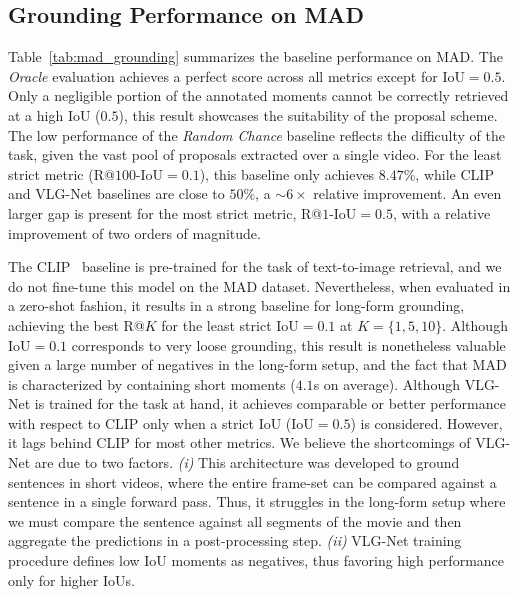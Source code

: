 \documentclass[10pt,twocolumn,letterpaper]{article}
\begin{document}
\subsection{Grounding Performance on MAD}
Table~\ref{tab:mad_grounding} summarizes the baseline performance on MAD. The  \textit{Oracle} evaluation achieves a perfect score across all metrics except for IoU${=}0.5$. Only a negligible portion of the annotated moments cannot be correctly retrieved at a high IoU ($0.5$), this result showcases the suitability of the proposal scheme. The low performance of the \textit{Random Chance} baseline  reflects the difficulty of the task, given the vast pool of proposals extracted over a single video. For the least strict metric (R@$100$-IoU${=}0.1$), this baseline only achieves  $8.47\%$, while CLIP and VLG-Net baselines are close to $50\%$, a ${\sim}6\times$ relative improvement. An even larger gap is present for the most strict metric, R@$1$-IoU${=}0.5$, with a relative improvement of two orders of magnitude.

The CLIP~\cite{radford2021learning} baseline is pre-trained for the task of text-to-image retrieval, and we do not fine-tune this model on the MAD dataset. Nevertheless, when evaluated in a zero-shot fashion, it results in a strong baseline for long-form grounding, achieving the best R@$K$ for the least strict IoU${=}0.1$ at $K{=}\{1,5,10\}$. Although IoU${=}0.1$ corresponds to very loose grounding, this result is nonetheless valuable given a large number of negatives in the long-form setup, and the fact that MAD is characterized by containing short moments ($4.1$s on average). Although VLG-Net is trained for the task at hand, it achieves comparable or better performance with respect to CLIP only when a strict IoU (IoU${=}0.5$) is considered. However, it lags behind CLIP for most other metrics. We believe the shortcomings of VLG-Net are due to two factors. \emph{(i)} This architecture was developed to ground sentences in short videos, where the entire frame-set can be compared against a sentence in a single forward pass. Thus, it struggles in the long-form setup where we must compare the sentence against all segments of the movie and then aggregate the predictions in a post-processing step. \emph{(ii)} VLG-Net training procedure defines low IoU moments as negatives, thus favoring high performance only for higher IoUs. 
\end{document}
